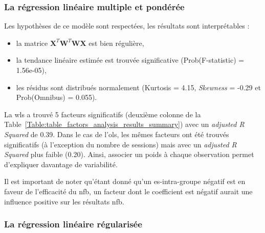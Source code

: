 \subsubsection{La régression linéaire multiple et pondérée}

Les hypothèses de ce modèle sont respectées, les résultats sont interprétables :
\begin{itemize}
	\item la matrice ${\textbf{X}}^{T}\textbf{W}^{T}\textbf{WX}$ est bien régulière,
  \item la tendance linéaire estimée est trouvée significative (Prob(F-statistic) = 1.56e-05),
  \item les résidus sont distribués normalement (Kurtosis = 4.15, \textit{Skewness} = -0.29 et Prob(Omnibus) = 0.055).
\end{itemize}

La \gls{wls} a trouvé 5 facteurs significatifs (deuxième colonne de la Table~\ref{Table:table_factors_analysis_results_summary}) avec un \textit{adjusted R Squared} de 0.39. 
Dans le cas de l'\gls{ols}, les mêmes facteurs ont été trouvés significatifs (à l'exception du nombre de sessions) mais avec un \textit{adjusted R Squared} plus faible (0.20). Ainsi, associer un poids
à chaque observation permet d'expliquer davantage de variabilité. 

Il est important de noter qu'étant donné qu'un \gls{es}-intra-groupe négatif est en faveur de l'efficacité du \gls{nfb},
un facteur dont le coefficient est négatif aurait une influence positive sur les résultats \gls{nfb}.


\subsubsection{La régression linéaire régularisée}

